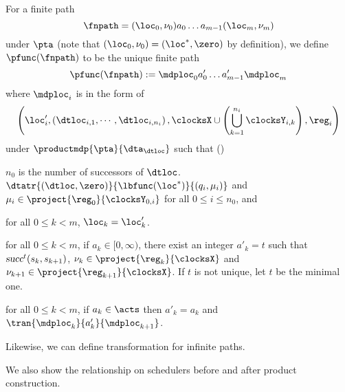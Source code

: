 For a finite path
\[
\fnpath=(\loc_0,\nu_0)a_0\dots a_{m-1}(\loc_m,\nu_m)
\]
under $\pta$ (note that $(\loc_0,\nu_0)=(\loc^*, \zero)$ by definition),
we define $\pfunc(\fnpath)$ to be the unique finite path
\begin{equation}
    \pfunc(\fnpath)
        :=
        \mdploc_0
        a'_0
        \dots 
        a'_{m-1}
        \mdploc_{m}
\end{equation}
where $\mdploc_i$ is in the form of 
\begin{equation}
    \left (
        \loc'_i
        ,
        \left (
            \dtloc_{i,1},
            \cdots,
            \dtloc_{i,n_i}
        \right )
        ,
        \clocksX \cup \left(
            \bigcup_{k=1}^{n_i} \clocksY_{i,k}
        \right )
        ,
        \reg_i
    \right )
\end{equation}
under $\productmdp{\pta}{\dta_\dtloc}$ such that (\dag)
\begin{compactitem}
\item   {\color{red}$ n_0 $ is the number of successors of $ \dtloc $.}
        $\dtatr
            {(\dtloc,\zero)}
            {\lbfunc(\loc^*)}
            {(q_i,\mu_i)}
        $ and
        $ \mu_i \in \project{\reg_0}{\clocksY_{0,i}} $ 
        for all $ 0 \le i \le n_0 $, and
\item   for all $0\le k < m$, $\loc_k = \loc'_k$.
\item   for all $0\le k < m$, if $a_k\in [0,\infty)$, there exist an integer $a'_k=t$ 
        such that $\mbox{\sl succ}^t(s_{k},s_{k+1})$, $ \nu_{k} \in \project{\reg_{k}}{\clocksX} $ and 
        $ \nu_{k+1} \in \project{\reg_{k+1}}{\clocksX} $. If $t$ is not unique, let $t$ be the minimal one.
\item   for all $0\le k < m$, if $a_k\in\acts$ then $a'_{k}=a_k$ and 
$
    \tran
        {\mdploc_{k}}
        {a'_{k}}
        {\mdploc_{k+1}}
$.
\end{compactitem}
Likewise, we can define transformation for infinite paths.

We also show the relationship on schedulers before and after product construction.

